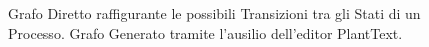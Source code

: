 \begin{figure}[H]
    \centering
    
    \label{fig:TransizioniStati}
    \caption[Transizioni tra gli Stati di un Processo]{Grafo Diretto raffigurante le possibili Transizioni tra gli Stati di un Processo. Grafo Generato tramite l'ausilio dell'editor PlantText\cite{PlantText}.}
\end{figure}
